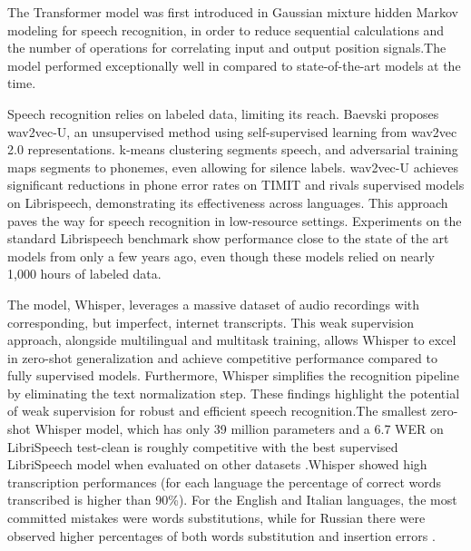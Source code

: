 The Transformer model was first introduced in Gaussian mixture hidden Markov modeling for speech recognition\cite{1198704}, in order to reduce sequential calculations and the number of operations for correlating input and output position signals\cite{orken2022study}.The model performed exceptionally well in compared to state-of-the-art models at the time.

Speech recognition relies on labeled data, limiting its reach. Baevski \cite{baevski2021unsupervised} proposes wav2vec-U, an unsupervised method using self-supervised learning from wav2vec 2.0 representations. k-means clustering segments speech, and adversarial training maps segments to phonemes, even allowing for silence labels. wav2vec-U achieves significant reductions in phone error rates on TIMIT and rivals supervised models on Librispeech, demonstrating its effectiveness across languages. This approach paves the way for speech recognition in low-resource settings. Experiments on the standard Librispeech benchmark show performance close to the state of the art models from only a few years ago, even though these models relied on nearly 1,000 hours of labeled data\cite{baevski2021unsupervised}. \newline

The model, Whisper, leverages a massive dataset of audio recordings with corresponding, but imperfect, internet transcripts. This weak supervision approach, alongside multilingual and multitask training, allows Whisper to excel in zero-shot generalization and achieve competitive performance compared to fully supervised models. Furthermore, Whisper simplifies the recognition pipeline by eliminating the text normalization step. These findings highlight the potential of weak supervision for robust and efficient speech recognition.The smallest zero-shot Whisper model, which has only 39 million parameters and a 6.7 WER on LibriSpeech test-clean is roughly competitive with the best supervised LibriSpeech model when evaluated on other datasets \cite{whisper}.Whisper showed high transcription performances (for each language the percentage of correct words transcribed is higher than 90\%). For the English and Italian languages, the most committed mistakes were words substitutions, while for Russian there were observed higher percentages of both words substitution and insertion errors \cite{amorese2023automatic}. \newline